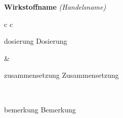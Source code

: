 \documentclass[12pt]{beamer}
\begin{document}
\begin{frame}{
    \textbf{Wirkstoffname}
    \textit{(Handelsname)}
}
    \begin{tabular}{c c}
        \begin{beamercolorbox}[wd=\boxwidth\textwidth,ht=\boxheight\textheight,sep=1em]{dosierung}
            Dosierung
        \end{beamercolorbox} & 
        \begin{beamercolorbox}[wd=\boxwidth\textwidth,ht=\boxheight\textheight,sep=1em]{zusammensetzung}
            Zusammensetzung
        \end{beamercolorbox} \\
        \begin{beamercolorbox}[wd=\textwidth,ht=\boxheight\textheight,sep=1em]{bemerkung}
            Bemerkung
        \end{beamercolorbox} \\
    \end{tabular}
\end{frame}
\end{document}
